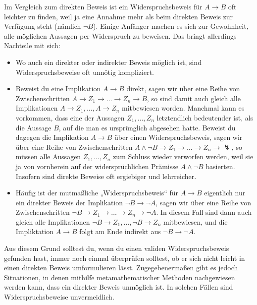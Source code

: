  
\begin{bem}
    Im Vergleich zum direkten Beweis ist ein Widerspruchsbeweis für $A\to B$ oft leichter zu finden, weil ja eine Annahme mehr als beim direkten Beweis zur Verfügung steht (nämlich $\neg B$). Einige Anfänger machen es sich zur Gewohnheit, alle möglichen Aussagen per Widerspruch zu beweisen. Das bringt allerdings Nachteile mit sich:
    \begin{itemize}
        \item Wo auch ein direkter oder indirekter Beweis möglich ist, sind Widerspruchsbeweise oft unnötig kompliziert.
        \item Beweist du eine Implikation $A\to B$ direkt, sagen wir über eine Reihe von Zwischenschritten $A\to Z_1\to\ldots\to Z_n\to B$, so sind damit auch gleich alle Implikationen $A\to Z_1,\dots , A\to Z_n$ mitbewiesen worden. Manchmal kann es vorkommen, dass eine der Aussagen $Z_1,\dots , Z_n$ letztendlich bedeutender ist, als die Aussage $B$, auf die man es ursprünglich abgesehen hatte. Beweist du dagegen die Implikation $A\to B$ über einen Widerspruchsbeweis, sagen wir über eine Reihe von Zwischenschritten $A\land \neg B \to Z_1\to\ldots\to Z_n \to \lightning$, so müssen alle Aussagen $Z_1,\dots , Z_n$ zum Schluss wieder verworfen werden, weil sie ja von vornherein auf der widersprüchlichen Prämisse $A\land \neg B$ basierten. Insofern sind direkte Beweise oft ergiebiger und lehrreicher.
        \item Häufig ist der mutmaßliche „Widerspruchsbeweis“ für $A\to B$ eigentlich nur ein direkter Beweis der Implikation $\neg B\to \neg A$, sagen wir über eine Reihe von Zwischenschritten $\neg B \to Z_1\to\ldots\to Z_n\to \neg A$. In diesem Fall sind dann auch gleich alle Implikationen $\neg B\to Z_1,\dots , \neg B\to Z_n$ mitbewiesen, und die Impliktation $A\to B$ folgt am Ende indirekt aus $\neg B\to \neg A$.
    \end{itemize}
    Aus diesem Grund solltest du, wenn du einen validen Widerspruchsbeweis gefunden hast, immer noch einmal überprüfen solltest, ob er sich nicht leicht in einen direkten Beweis umformulieren lässt. Zugegebenermaßen gibt es jedoch Situationen, in denen mithilfe metamathematischer Methoden nachgewiesen werden kann, dass ein direkter Beweis unmöglich ist. In solchen Fällen sind Widerspruchsbeweise unvermeidlich.
\end{bem}
  
